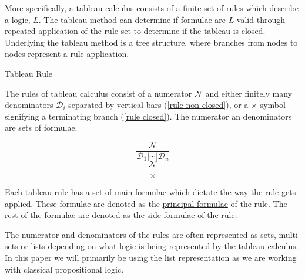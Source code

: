 \documentclass{llncs}
\newcommand{\comment}[1]{}
\begin{document}
More specifically, a tableau calculus consists of a finite set of rules which
describe a logic, $L$. The tableau method can determine if formulae
are $L$-valid through repeated application of the rule set to
determine if the tableau is closed. Underlying the tableau method is a tree
structure, where branches from nodes to nodes represent a rule application.
%
\begin{definition}{Tableau Rule}\label{Tableau Rule}

The rules of tableau calculus consist of a numerator $\mathcal{N}$ and
either finitely many denominators $\mathcal{D}_i$ separated by vertical bars
(\ref{rule non-closed}), or a $\times$ symbol signifying a terminating branch
(\ref{rule closed}).  The numerator an denominators are sets of formulae.
%
\comment{
The rules of a tableau calculus are expressed as sets, multi-sets or lists
depending on the logic being expressed. We will express the tableau rules as a
list as we are primarily working with classical propositional logic. A rule is
composed of a numerator and a denominator. A numerator $\mathcal{N}$ is a set
of formulae in the logical system $L$. A denominator is either a set of
branches, $\mathcal{D}_i$, which are each sets of formulae in $L$ or the symbol
$\times$ signifying a closed tableau, indicated the termination of a branch.
These rules are typically written as the following where (\ref{rule
non-closed}) represents a rule with a denominator as a set of formulae and
(\ref{rule closed}) represents a rule which results in a closed branch,
}
%
\begin{multicols}{2}
\noindent
\begin{equation}
\frac{\mathcal{N}}{\mathcal{D}_1 \vert \cdots \vert \mathcal{D}_n}
\label{rule non-closed}
\end{equation}
\begin{equation}
\frac{\mathcal{N}}{\times}
\label{rule closed}
\end{equation}
\end{multicols}
%
Each tableau rule has a set of main formulae which dictate the way the rule
gets applied. These formulae are denoted as the \underline{principal formulae}
of the rule. The rest of the formulae are denoted as the \underline{side
formulae} of the rule.

The numerator and denominators of the rules are often represented as sets,
multi-sets or lists depending on what logic is being represented by the tableau
calculus. In this paper we will primarily be using the list representation as
we are working with classical propositional logic.
\end{definition}
\end{document}
